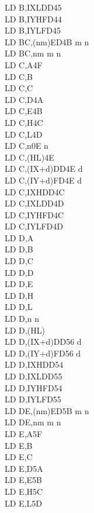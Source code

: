 \documentclass[12pt,twoside,openright,a4paper]{book}
\begin{document}
\begin{multicols}{3}
{\begin{tabbing}
		LD B,IXL\UNDOC\>DD45\\
		LD B,IYH\UNDOC\>FD44\\
		LD B,IYL\UNDOC\>FD45\\
		LD BC,(nm)\>ED4B m n\\
		LD BC,nm m n\\
		LD C,A\>4F\\
		LD C,B\\
		LD C,C\\
		LD C,D\>4A\\
		LD C,E\>4B\\
		LD C,H\>4C\\
		LD C,L\>4D\\
		LD C,n\>0E n\\
		LD C,(HL)\>4E\\
		LD C,(IX+d)\>DD4E d\\
		LD C,(IY+d)\>FD4E d\\
		LD C,IXH\UNDOC\>DD4C\\
		LD C,IXL\UNDOC\>DD4D\\
		LD C,IYH\UNDOC\>FD4C\\
		LD C,IYL\UNDOC\>FD4D\\
		LD D,A\\
		LD D,B\\
		LD D,C\\
		LD D,D\\
		LD D,E\\
		LD D,H\\
		LD D,L\\
		LD D,n n\\
		LD D,(HL)\\
		LD D,(IX+d)\>DD56 d\\
		LD D,(IY+d)\>FD56 d\\
		LD D,IXH\UNDOC\>DD54\\
		LD D,IXL\UNDOC\>DD55\\
		LD D,IYH\UNDOC\>FD54\\
		LD D,IYL\UNDOC\>FD55\\
		LD DE,(nm)\>ED5B m n\\
		LD DE,nm m n\\
		LD E,A\>5F\\
		LD E,B\\
		LD E,C\\
		LD E,D\>5A\\
		LD E,E\>5B\\
		LD E,H\>5C\\
		LD E,L\>5D\\

\end{tabbing}}
\end{multicols}
\end{document}
